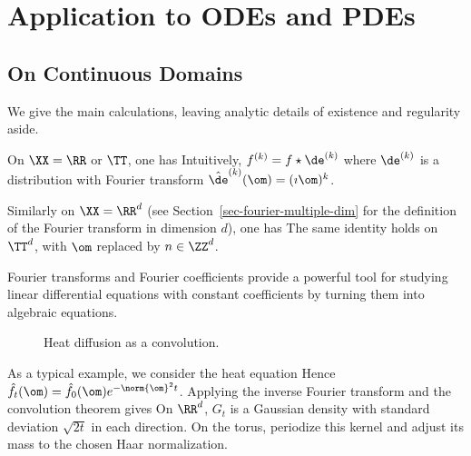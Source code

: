 \section{Application to ODEs and PDEs}
\label{sec-fourier-pdes}

                                                
\subsection{On Continuous Domains}

We give the main calculations, leaving analytic details of existence and regularity aside.

On $\XX=\RR$ or $\TT$, one has
Intuitively, $f^{(k)} = f \star \de^{(k)}$ where $\de^{(k)}$ is a distribution with Fourier transform $\hat \de^{(k)}(\om) = (\imath \om)^k$. 
 
Similarly on $\XX=\RR^d$ (see Section~\ref{sec-fourier-multiple-dim} for the definition of the Fourier transform in dimension $d$), one has
The same identity holds on $\TT^d$, with $\om$ replaced by $n \in \ZZ^d$.
 
Fourier transforms and Fourier coefficients provide a powerful tool for studying linear differential equations with constant coefficients by turning them into algebraic equations.

\begin{figure}[tbp]
\centering
{}
\caption{Heat diffusion as a convolution.}
\label{fig-heat}
\end{figure}

As a typical example, we consider the heat equation
Hence $\hat f_t(\om) = \hat f_0(\om) e^{-\norm{\om}^2 t}$. Applying the inverse Fourier transform and the convolution theorem gives
On $\RR^d$, $G_t$ is a Gaussian density with standard deviation $\sqrt{2t}$ in each direction. On the torus, periodize this kernel and adjust its mass to the chosen Haar normalization.


                                                
